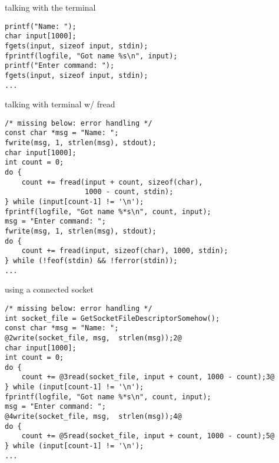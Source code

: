 \begin{frame}[fragile]{talking with the terminal}
\begin{lstlisting}
printf("Name: ");
char input[1000];
fgets(input, sizeof input, stdin);
fprintf(logfile, "Got name %s\n", input);
printf("Enter command: ");
fgets(input, sizeof input, stdin);
...
\end{lstlisting}
\end{frame}

\begin{frame}[fragile]{talking with terminal w/ fread}
\begin{lstlisting}
/* missing below: error handling */
const char *msg = "Name: ";
fwrite(msg, 1, strlen(msg), stdout);
char input[1000];
int count = 0;
do {
    count += fread(input + count, sizeof(char),
                   1000 - count, stdin);
} while (input[count-1] != '\n');
fprintf(logfile, "Got name %*s\n", count, input);
msg = "Enter command: ";
fwrite(msg, 1, strlen(msg), stdout);
do {
    count += fread(input, sizeof(char), 1000, stdin);
} while (!feof(stdin) && !ferror(stdin));
...
\end{lstlisting}
\end{frame}



\begin{frame}[fragile]{using a connected socket}
\begin{lstlisting}
/* missing below: error handling */
int socket_file = GetSocketFileDescriptorSomehow();
const char *msg = "Name: ";
@2write(socket_file, msg,  strlen(msg));2@
char input[1000];
int count = 0;
do {
    count += @3read(socket_file, input + count, 1000 - count);3@
} while (input[count-1] != '\n');
fprintf(logfile, "Got name %*s\n", count, input);
msg = "Enter command: ";
@4write(socket_file, msg,  strlen(msg));4@
do {
    count += @5read(socket_file, input + count, 1000 - count);5@
} while (input[count-1] != '\n');
...
\end{lstlisting}
\end{frame}
